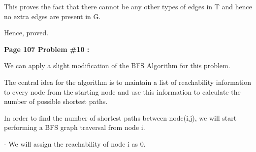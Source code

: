 \documentclass[letterpaper,portrait,12pt]{article}
\begin{document}
\begin{flushleft}

\end{flushleft}


\begin{flushleft}
This proves the fact that there cannot be any other types of edges in T and hence no extra edges are present in G.
\end{flushleft}


\begin{flushleft}

\end{flushleft}


\begin{flushleft}
Hence, proved.
\end{flushleft}


\begin{flushleft}

\end{flushleft}


\begin{flushleft}
\textbf{Page 107 Problem \#10 :}
\end{flushleft}


\begin{flushleft}

\end{flushleft}


\begin{flushleft}
We can apply a slight modification of the BFS Algorithm for this problem.
\end{flushleft}


\begin{flushleft}
The central idea for the algorithm is to maintain a list of reachability information to every node from the starting node and use this information to calculate the number of possible shortest paths.
\end{flushleft}


\begin{flushleft}

\end{flushleft}


\begin{flushleft}
In order to find the number of shortest paths between node(i,j), we will start performing a BFS graph traversal from node i. 
\end{flushleft}


\begin{flushleft}
- We will assign the reachability of node i as 0.
\end{flushleft}
\end{document}
